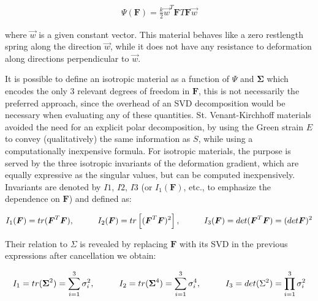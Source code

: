 \begin{gather*}
 \Psi(\boldsymbol{F}) = \frac{k}{2}\vec{w}^T\boldsymbol{F}T\boldsymbol{F}\vec{w}
\end{gather*}

where $\vec{w}$ is a given constant vector. This material behaves like a zero restlength spring along the direction $\vec{w}$, while it does
not have any resistance to deformation along directions perpendicular to $\vec{w}$.

It is possible to define an isotropic material as a function of $\Psi$ and $\boldsymbol{\Sigma}$ which encodes the only 3 relevant degrees of freedom
in $\boldsymbol{F}$, this is not necessarily the preferred approach, since the overhead of an SVD decomposition would be necessary when evaluating 
any of these quantities. St. Venant-Kirchhoff materials avoided the need for an explicit polar decomposition, by using the Green strain $E$
to convey (qualitatively) the same information as $S$, while using a computationally inexpensive formula. For isotropic materials, the purpose is served 
by the three isotropic invariants of the deformation gradient, which are equally expressive as the singular values, but can be computed inexpensively. 
Invariants are denoted by $I1$, $I2$, $I3$ (or $I_1(\boldsymbol{F})$, etc., to emphasize the dependence on $\boldsymbol{F}$) and defined as:

\begin{gather*}
I_1(\boldsymbol{F})=tr(\boldsymbol{F}^T\boldsymbol{F}), \hspace{10mm}I_2(\boldsymbol{F})=tr\left[(\boldsymbol{F}^T\boldsymbol{F})^2\right], 
\hspace{10mm}I_3(\boldsymbol{F})=det(\boldsymbol{F}^T\boldsymbol{F})=(det\boldsymbol{F})^2
\end{gather*}

Their relation to $\Sigma$ is revealed by replacing $\boldsymbol{F}$ with its SVD in the previous expressions after cancellation we obtain:

\begin{gather*}
I_1 = tr(\boldsymbol{\Sigma}^2)=\sum_{i=1}^3\sigma_i^2, \hspace{10mm}I_2=tr(\boldsymbol{\Sigma}^4)=\sum_{i=1}^3\sigma_i^4, 
\hspace{10mm}I_3=det(\Sigma^2)=\prod_{i=1}^3\sigma_i^2
\end{gather*}

